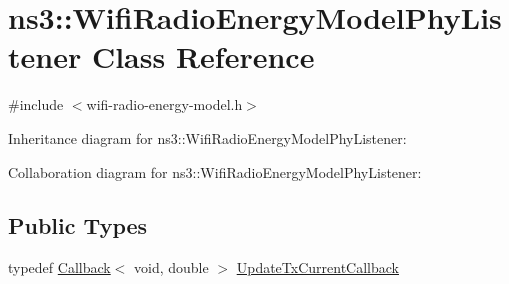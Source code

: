 \hypertarget{classns3_1_1WifiRadioEnergyModelPhyListener}{}\section{ns3\+:\+:Wifi\+Radio\+Energy\+Model\+Phy\+Listener Class Reference}
\label{classns3_1_1WifiRadioEnergyModelPhyListener}


{\ttfamily \#include $<$wifi-\/radio-\/energy-\/model.\+h$>$}



Inheritance diagram for ns3\+:\+:Wifi\+Radio\+Energy\+Model\+Phy\+Listener\+:


Collaboration diagram for ns3\+:\+:Wifi\+Radio\+Energy\+Model\+Phy\+Listener\+:
\subsection*{Public Types}
\begin{DoxyCompactItemize}
\item 
typedef \hyperlink{classns3_1_1Callback}{Callback}$<$ void, double $>$ \hyperlink{classns3_1_1WifiRadioEnergyModelPhyListener_a0263a4adc144a5406f9b4b504e7a7a16}{Update\+Tx\+Current\+Callback}
\end{DoxyCompactItemize}
